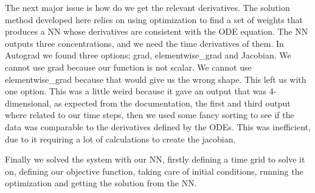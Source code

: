 	The next major issue is how do we get the relevant derivatives. The solution method developed here relies on using optimization to find a set of weights that produces a NN whose derivatives are consistent with the ODE equation.
	The NN outputs three concentrations, and we need the time derivatives of them. In Autograd we found three options; grad, elementwise\_grad and Jacobian. We cannot use grad because our function is not scalar. We cannot use elementwise\_grad because that would give us the wrong shape. This left us with one option. This was a little weird because it gave an output that was 4-dimensional, as expected from the documentation, the first and third output where related to our time steps, then we used some fancy sorting to see if the data was comparable to the derivatives defined by the ODEs. This was inefficient, due to it requiring a lot of calculations to create the jacobian.
	
	Finally we solved the system with our NN, firstly defining a time grid to solve it on, defining our objective function, taking care of initial conditions, running the optimization and getting the solution from the NN.


